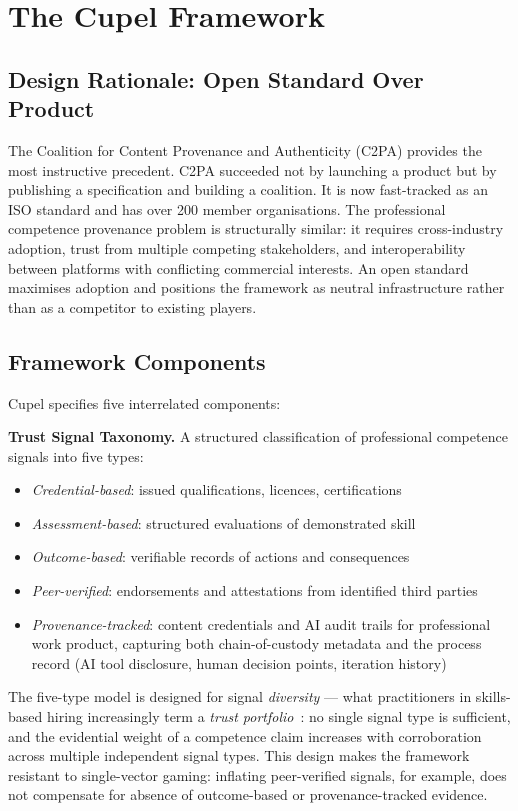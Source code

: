 \documentclass[11pt,a4paper]{article}
\begin{document}
\section{The Cupel Framework}

\subsection{Design Rationale: Open Standard Over Product}

The Coalition for Content Provenance and Authenticity (C2PA) provides the most instructive
precedent. C2PA succeeded not by launching a product but by publishing a specification and building
a coalition. It is now fast-tracked as an ISO standard and has over 200 member organisations.
The professional competence provenance problem is structurally similar: it requires cross-industry
adoption, trust from multiple competing stakeholders, and interoperability between platforms with
conflicting commercial interests. An open standard maximises adoption and positions the framework
as neutral infrastructure rather than as a competitor to existing players.

\subsection{Framework Components}

Cupel specifies five interrelated components:

\textbf{Trust Signal Taxonomy.} A structured classification of professional competence signals
into five types:
\begin{itemize}[noitemsep]
  \item \emph{Credential-based}: issued qualifications, licences, certifications
  \item \emph{Assessment-based}: structured evaluations of demonstrated skill
  \item \emph{Outcome-based}: verifiable records of actions and consequences
  \item \emph{Peer-verified}: endorsements and attestations from identified third parties
  \item \emph{Provenance-tracked}: content credentials and AI audit trails for professional
        work product, capturing both chain-of-custody metadata and the process record
        (AI tool disclosure, human decision points, iteration history)
\end{itemize}

The five-type model is designed for signal \emph{diversity} — what practitioners in
skills-based hiring increasingly term a \emph{trust portfolio}~\cite{sbhiring2025}: no single
signal type is sufficient, and the evidential weight of a competence claim increases with
corroboration across multiple independent signal types. This design makes the framework resistant
to single-vector gaming: inflating peer-verified signals, for example, does not compensate for
absence of outcome-based or provenance-tracked evidence.
\end{document}
